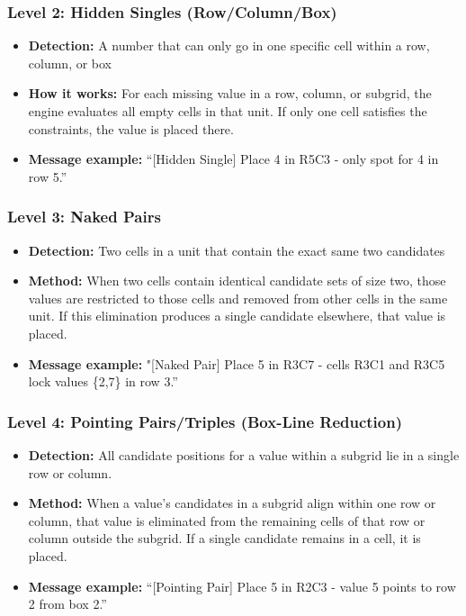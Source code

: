 \documentclass[12pt,a4paper]{article}
\begin{document}
\subsubsection*{Level 2: Hidden Singles (Row/Column/Box)}
\begin{itemize}
    \item \textbf{Detection:} A number that can only go in one specific cell within a row, column, or box
    \item \textbf{How it works:} For each missing value in a row, column, or subgrid, the engine evaluates all empty cells in that unit. If only one cell satisfies the constraints, the value is placed there.
    \item \textbf{Message example:} “[Hidden Single] Place 4 in R5C3 - only spot for 4 in row 5.”
\end{itemize}

\subsubsection*{Level 3: Naked Pairs}
\begin{itemize}
    \item \textbf{Detection:} Two cells in a unit that contain the exact same two candidates
    \item \textbf{Method:} When two cells contain identical candidate sets of size two, those values are restricted to those cells and removed from other cells in the same unit. If this elimination produces a single candidate elsewhere, that value is placed.
    \item \textbf{Message example:} "[Naked Pair] Place 5 in R3C7 - cells R3C1 and R3C5 lock values \{2,7\} in row 3.”
\end{itemize}

\subsubsection*{Level 4: Pointing Pairs/Triples (Box-Line Reduction)}
\begin{itemize}
    \item \textbf{Detection:} All candidate positions for a value within a subgrid lie in a single row or column.
    \item \textbf{Method:} When a value’s candidates in a subgrid align within one row or column, that value is eliminated from the remaining cells of that row or column outside the subgrid. If a single candidate remains in a cell, it is placed.
    \item \textbf{Message example:} “[Pointing Pair] Place 5 in R2C3 - value 5 points to row 2 from box 2.”
\end{itemize}
\end{document}
